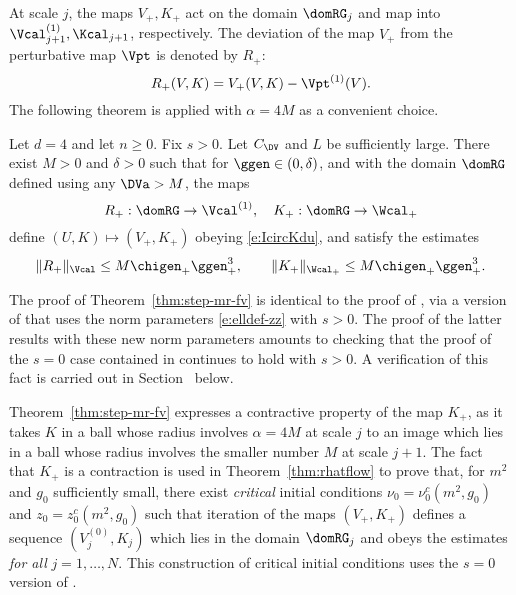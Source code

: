 At scale $j$, the maps $V_+,K_+$ act on the domain $\domRG_j$
and map into $\Vcal_{j+1}^{(1)},\Kcal_{j+1}$, respectively.
The deviation of the map $V_+$ from the perturbative map $\Vpt$
is denoted by $R_+$:
\begin{equation}
\label{e:Rplusdef}
    R_+(V,K) = V_+(V,K) -\Vpt^{(1)}(V).
\end{equation}
The following theorem is applied with $\alpha =4M$ as a convenient choice.

\begin{theorem}
\label{thm:step-mr-fv}
Let $d = 4$ and let $n \ge 0$. Fix $s > 0$.
Let $C_\DV$ and $L$ be sufficiently large.
There exist $M>0$ and $\delta >0$ such that
for $\ggen \in (0,\delta)$, %
and with the domain
$\domRG$ defined using any $\DVa> M$, the maps
\begin{equation}
\label{e:RKplusmaps}
R_+:\domRG %
\to \Vcal^{(1)},
\quad
K_+:\domRG %
\to \Wcal_{+}%
\end{equation}
define $(U,K)\mapsto (V_+,K_+)$ obeying \eqref{e:IcircKdu},
and satisfy the estimates
\begin{equation}
\label{e:RKplus}
\|R_+\|_{\Vcal}
\le
M\chigen_+\ggen_+^{3}
, \qquad
\|K_+\|_{\Wcal_+}
\le
M\chigen_+ \ggen_+^{3}
.
\end{equation}
\end{theorem}

The proof of Theorem~\ref{thm:step-mr-fv} is identical to the proof of
\cite[Theorem~\ref{phi4-thm:step-mr-fv}]{ST-phi4}, via a version of
\cite[Theorems~\ref{step-thm:mr-R}--\ref{step-thm:mr}]{BS-rg-step} that
uses the norm parameters \eqref{e:elldef-zz} with $s > 0$.
The proof of the latter results with these new norm parameters amounts to
checking that the proof of the $s = 0$ case contained in \cite{BS-rg-IE,BS-rg-step}
continues to hold with $s > 0$. A verification of this fact is carried
out in Section~\REF %
below.

Theorem~\ref{thm:step-mr-fv} expresses a contractive property of the map $K_+$,
as it takes $K$ in a ball whose radius involves $\alpha=4M$ at scale $j$ to
an image which lies in a ball whose radius involves the smaller number $M$
at scale $j+1$.  The fact that $K_+$ is a contraction is used in
Theorem~\ref{thm:rhatflow}
to prove that, for $m^2$ and $g_0$ sufficiently small, there exist
\emph{critical} initial conditions
$\nu_0 = \nu_0^c(m^2, g_0)$ and $z_0 = z_0^c(m^2, g_0)$ such that
iteration of the maps $(V_+,K_+)$ defines a sequence $(V_j^{(0)}, K_j)$
which lies in the domain $\domRG_j$ and obeys the estimates 
\emph{for all} $j = 1, \ldots, N$.
This construction of critical initial conditions uses the $s=0$ version
of .

